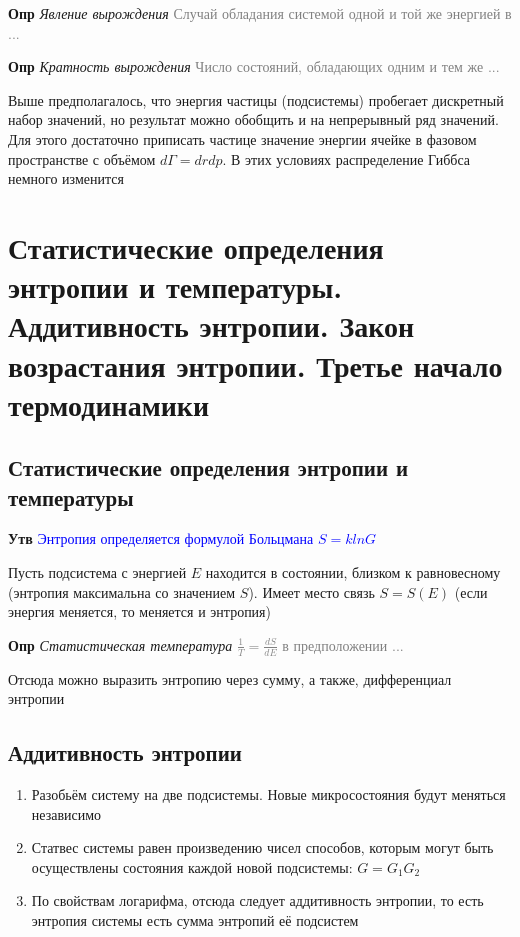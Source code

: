 \documentclass[a4paper, 14pt]{article}
\begin{document}
    \textbf{Опр} \textit{Явление вырождения} \textcolor{gray}{Случай обладания системой одной и той же энергией в ...}

    \textbf{Опр} \textit{Кратность вырождения} \textcolor{gray}{Число состояний, обладающих одним и тем же ...}

    Выше предполагалось, что энергия частицы (подсистемы) пробегает дискретный набор значений, но результат можно
    обобщить и на непрерывный ряд значений.
    Для этого достаточно приписать частице значение энергии ячейке в фазовом пространстве с объёмом $d\Gamma = dr dp$.
    В этих условиях распределение Гиббса немного изменится

    \section{Статистические определения энтропии и температуры.
    Аддитивность энтропии.
    Закон возрастания энтропии.
    Третье начало термодинамики}

    \subsection{Статистические определения энтропии и температуры}

    \textbf{Утв} \textcolor{blue}{Энтропия определяется формулой Больцмана $S = klnG$}

    Пусть подсистема с энергией $E$ находится в состоянии, близком к равновесному (энтропия максимальна со значением $S$).
    Имеет место связь $S = S(E)$ (если энергия меняется, то меняется и энтропия)

    \textbf{Опр} \textit{Статистическая температура} \textcolor{gray}{$\frac{1}{T} = \frac{dS}{dE}$ в предположении ...}

    Отсюда можно выразить энтропию через сумму, а также, дифференциал энтропии

    \subsection{Аддитивность энтропии}

    \begin{enumerate}
        \item Разобьём систему на две подсистемы.
        Новые микросостояния будут меняться независимо
        \item Статвес системы равен произведению чисел способов, которым могут быть осуществлены состояния каждой
        новой подсистемы: $G = G_1 G_2$
        \item По свойствам логарифма, отсюда следует аддитивность энтропии, то есть энтропия системы есть сумма
        энтропий её подсистем
    \end{enumerate}
\end{document}
